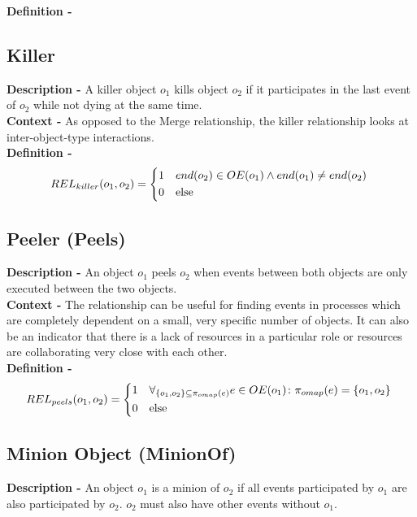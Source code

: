 \documentclass{article}
\begin{document}
\noindent\textbf{Definition -}
\subsection{Killer}
\noindent\textbf{Description -} A killer object $o_1$ kills object $o_2$ if it participates in the last event of $o_2$ while not dying at the same time.\\

\noindent\textbf{Context -} As opposed to the Merge relationship, the killer relationship looks at inter-object-type interactions. \\

\noindent\textbf{Definition -}
\begin{equation}
	REL_{killer}(o_1, o_2) =
	\begin{cases*}
		1 & $end(o_2) \in OE(o_1) \wedge end(o_1) \neq end(o_2)$ \\ 
		0 & else
	\end{cases*}
\end{equation}
\subsection{Peeler (Peels)}
\noindent\textbf{Description -} An object $o_1$ peels $o_2$ when events between both objects are only executed between the two objects.\\

\noindent\textbf{Context -} The relationship can be useful for finding events in processes which are completely dependent on a small, very specific number of objects. It can also be an indicator that there is a lack of resources in a particular role or resources are collaborating very close with each other. \\

\noindent\textbf{Definition -}
\begin{equation}
	REL_{peels}(o_1, o_2) =
	\begin{cases*}
		1 & $\forall_{\{o_1, o_2\} \subseteq \pi_{omap}(e)}e \in OE(o_1) \colon \pi_{omap}(e) = \{o_1, o_2\}$ \\ 
		0 & else
	\end{cases*}
\end{equation}
\subsection{Minion Object (MinionOf)}
\noindent\textbf{Description -} An object $o_1$ is a minion of $o_2$ if all events participated by $o_1$ are also participated by $o_2$. $o_2$ must also have other events without $o_1$.\\
\end{document}
